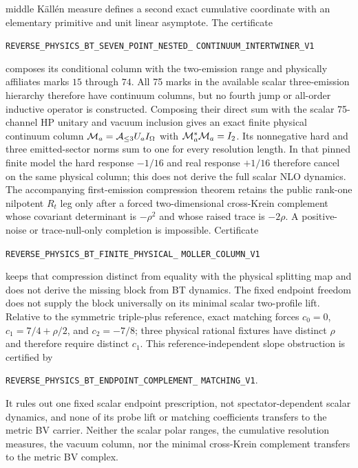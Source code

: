\documentclass[11pt]{article}
\theoremstyle{definition}
\theoremstyle{remark}
\begin{document}
middle K\"all\'en measure defines a second exact cumulative coordinate with an
elementary primitive and unit linear asymptote.  The certificate
\par\noindent
\texttt{REVERSE\_PHYSICS\_BT\_SEVEN\_POINT\_NESTED\_}
\allowbreak\texttt{CONTINUUM\_INTERTWINER\_V1}
\par\noindent
composes its conditional column with the two-emission range and physically
affiliates marks $15$ through $74$.  All 75 marks in the available scalar
three-emission hierarchy therefore have continuum columns, but no fourth jump
or all-order inductive operator is constructed.  Composing their direct sum
with the scalar 75-channel HP unitary and vacuum inclusion gives an exact
finite physical continuum column
${\cal M}_a={\cal A}_{\leq3}U_aI_\Omega$ with
${\cal M}_a^*{\cal M}_a=I_2$.  Its nonnegative hard and three emitted-sector
norms sum to one for every resolution length.  In that pinned finite model
the hard response $-1/16$ and real response $+1/16$ therefore cancel on the
same physical column; this does not derive the full scalar NLO dynamics.
The accompanying first-emission compression theorem retains the public
rank-one nilpotent $R_t$ leg only after a forced two-dimensional cross-Krein
complement whose covariant determinant is $-\rho^2$ and whose raised trace
is $-2\rho$.  A positive-noise or trace-null-only completion is impossible.
Certificate
\par\noindent
\texttt{REVERSE\_PHYSICS\_BT\_FINITE\_PHYSICAL\_}
\allowbreak\texttt{MOLLER\_COLUMN\_V1}
\par\noindent
keeps that compression distinct from equality with the physical splitting
map and does not derive the missing block from BT dynamics.  The fixed
endpoint freedom does not supply the block universally on its minimal scalar
two-profile lift.  Relative to the symmetric triple-plus reference, exact
matching forces
$c_0=0$, $c_1=7/4+\rho/2$, and $c_2=-7/8$; three physical rational fixtures
have distinct $\rho$ and therefore require distinct $c_1$.  This
reference-independent slope obstruction is certified by
\par\noindent
\texttt{REVERSE\_PHYSICS\_BT\_ENDPOINT\_COMPLEMENT\_}
\allowbreak\texttt{MATCHING\_V1}.
\par\noindent
It rules out one fixed scalar endpoint prescription, not
spectator-dependent scalar dynamics, and none of its probe lift or matching
coefficients transfers to the metric BV carrier.  Neither the
scalar polar ranges, the cumulative resolution measures, the vacuum column,
nor the minimal cross-Krein complement transfers to the metric BV complex.
\end{document}
